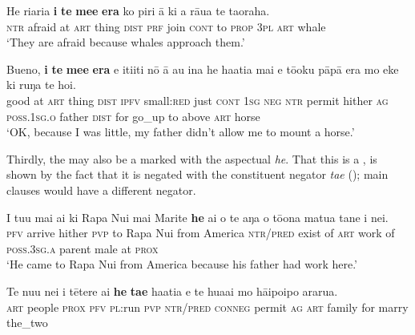 \ea\label{ex:11.254}
\gll He ri{\ꞌ}ari{\ꞌ}a \textbf{{\ꞌ}i} \textbf{te} \textbf{me{\ꞌ}e} \textbf{era} ko piri {\ꞌ}ā ki a rāua te ta{\ꞌ}oraha. \\
\textsc{ntr} afraid at \textsc{art} thing \textsc{dist} \textsc{prf} join \textsc{cont} to \textsc{prop} \textsc{3pl} \textsc{art} whale \\

\glt 
‘They are afraid because whales approach them.’ \textstyleExampleref{[R364.038–039]} 
\z

\ea\label{ex:11.255}
\gll Bueno, \textbf{{\ꞌ}i} \textbf{te} \textbf{me{\ꞌ}e} \textbf{era} e {\ꞌ}iti{\ꞌ}iti nō {\ꞌ}ā au {\ꞌ}ina he ha{\ꞌ}ati{\ꞌ}a mai  e tō{\ꞌ}oku pāpā era mo eke ki ruŋa te hoi.\\
good at \textsc{art} thing \textsc{dist} \textsc{ipfv} small:\textsc{red} just \textsc{cont} \textsc{1sg} \textsc{neg} \textsc{ntr} permit hither  \textsc{ag} \textsc{poss.1sg.o} father \textsc{dist} for go\_up to above \textsc{art} horse\\

\glt 
‘OK, because I was little, my father didn’t allow me to mount a horse.’ \textstyleExampleref{[R101.004]} 
\z

Thirdly, the  may also be a  marked with the aspectual \textit{he}. That this is a , is shown by the fact that it is negated with the constituent negator \textit{ta{\ꞌ}e} (); main clauses would have a different negator. 

\ea\label{ex:11.256}
\gll I tu{\ꞌ}u mai ai ki Rapa Nui mai Marite \textbf{he} ai o te aŋa  o tō{\ꞌ}ona matu{\ꞌ}a tane {\ꞌ}i nei.\\
\textsc{pfv} arrive hither \textsc{pvp} to Rapa Nui from America \textsc{ntr}/\textsc{pred} exist of \textsc{art} work  of \textsc{poss.3sg.a} parent male at \textsc{prox}\\

\glt 
‘He came to Rapa Nui from America because his father had work here.’ \textstyleExampleref{[R461.002]} 
\z

\ea\label{ex:11.257}
\gll Te nu{\ꞌ}u nei i tētere ai \textbf{he} \textbf{ta{\ꞌ}e} ha{\ꞌ}ati{\ꞌ}a e te hua{\ꞌ}ai  mo hāipoipo ararua.\\
\textsc{art} people \textsc{prox} \textsc{pfv} \textsc{pl}:run \textsc{pvp} \textsc{ntr}/\textsc{pred} \textsc{conneg} permit \textsc{ag} \textsc{art} family  for marry the\_two\\

